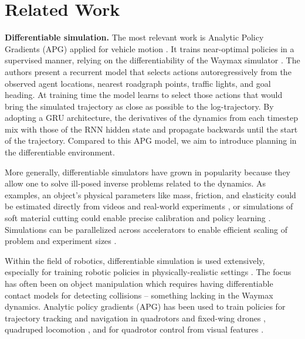 \section{Related Work}
\label{sec: related_work}

\textbf{Differentiable simulation.} The most relevant work is Analytic Policy Gradients (APG) applied for vehicle motion \cite{nachkov2024autonomous}. It trains near-optimal policies in a supervised manner, relying on the differentiability of the Waymax simulator \cite{gulino2024waymax}. The authors present a recurrent model that selects actions autoregressively from the observed agent locations, nearest roadgraph points, traffic lights, and goal heading. At training time the model learns to select those actions that would bring the simulated trajectory as close as possible to the log-trajectory. By adopting a GRU architecture, the derivatives of the dynamics from each timestep mix with those of the RNN hidden state and propagate backwards until the start of the trajectory. Compared to this APG model, we aim to introduce planning in the differentiable environment.

More generally, differentiable simulators have grown in popularity because they allow one to solve ill-posed inverse problems related to the dynamics. As examples, an object's physical parameters like mass, friction, and elasticity could be estimated directly from videos and real-world experiments \cite{de2018end, murthy2020gradsim, geilinger2020add}, or simulations of soft material cutting could enable precise calibration and policy learning \cite{heiden2021disect}. Simulations can be parallelized across accelerators to enable efficient scaling of problem and experiment sizes \cite{xu2022accelerated, warp2022, freeman2021brax}.

Within the field of robotics, differentiable simulation is used extensively, especially for training robotic policies in physically-realistic settings \cite{newbury2024review, lutter2021differentiable, toussaint2018differentiable, qiao2020scalable, holl2020learning}. The focus has often been on object manipulation \cite{li2023dexdeform, xu2021end, xu2023efficient, lin2022diffskill} which requires having differentiable contact models for detecting collisions -- something lacking in the Waymax dynamics. Analytic policy gradients (APG) has been used to train policies for trajectory tracking and navigation in quadrotors and fixed-wing drones \cite{wiedemann2023training}, quadruped locomotion \cite{song2024learning}, and for quadrotor control from visual features \cite{heeg2024learning}. 

